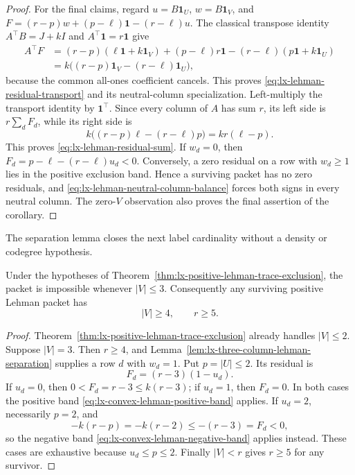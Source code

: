 \begin{proof}
For the final claims, regard $u=B\mathbf1_U$, $w=B\mathbf1_V$, and
$F=(r-p)w+(p-\ell)\mathbf1-(r-\ell)u$.  The classical transpose identity
$A^\top B=J+kI$ and $A^\top\mathbf1=r\mathbf1$ give
\begin{align*}
 A^\top F
 &=(r-p)(\ell\mathbf1+k\mathbf1_V)
   +(p-\ell)r\mathbf1
   -(r-\ell)(p\mathbf1+k\mathbf1_U)\\
 &=k\bigl((r-p)\mathbf1_V-(r-\ell)\mathbf1_U\bigr),
\end{align*}
because the common all-ones coefficient cancels.  This proves
\eqref{eq:lx-lehman-residual-transport} and its neutral-column specialization.
Left-multiply the transport identity by $\mathbf1^\top$.  Since every column
of $A$ has sum $r$, its left side is $r\sum_dF_d$, while its right side is
\[
 k\bigl((r-p)\ell-(r-\ell)p\bigr)=kr(\ell-p).
\]
This proves \eqref{eq:lx-lehman-residual-sum}.
If $w_d=0$, then
$F_d=p-\ell-(r-\ell)u_d<0$.  Conversely, a zero residual on a row with
$w_d\geq1$ lies in the positive exclusion band.  Hence a surviving packet
has no zero residuals, and
\eqref{eq:lx-lehman-neutral-column-balance} forces both signs in every
neutral column.  The zero-$V$ observation also proves the final assertion of
the corollary.
\end{proof}

The separation lemma closes the next label cardinality without a density or
codegree hypothesis.

\begin{corollary}
\label{cor:lx-three-gaining-column-exclusion}
Under the hypotheses of
Theorem~\ref{thm:lx-positive-lehman-trace-exclusion}, the packet is impossible
whenever $|V|\leq3$.  Consequently any surviving positive Lehman packet has
\[
 |V|\geq4,\qquad r\geq5.                           \tag{LH-4}
 \label{eq:lx-positive-lehman-survivor-floor}
\]
\end{corollary}

\begin{proof}
Theorem~\ref{thm:lx-positive-lehman-trace-exclusion} already handles
$|V|\leq2$.  Suppose $|V|=3$.  Then $r\geq4$, and
Lemma~\ref{lem:lx-three-column-lehman-separation} supplies a row $d$ with
$w_d=1$.  Put $p=|U|\leq2$.  Its residual is
\[
 F_d=(r-3)(1-u_d).                                  \tag{LH-3c}
 \label{eq:lx-three-column-residual}
\]
If $u_d=0$, then $0<F_d=r-3\leq k(r-3)$; if $u_d=1$, then $F_d=0$.
In both cases the positive band
\eqref{eq:lx-convex-lehman-positive-band} applies.  If $u_d=2$, necessarily
$p=2$, and
\[
 -k(r-p)=-k(r-2)\leq-(r-3)=F_d<0,
\]
so the negative band
\eqref{eq:lx-convex-lehman-negative-band} applies instead.  These cases are
exhaustive because $u_d\leq p\leq2$.  Finally $|V|<r$ gives $r\geq5$ for any
survivor.
\end{proof}

